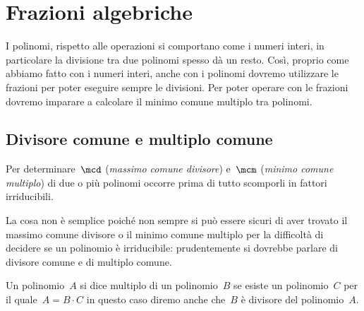 


\chapter{Frazioni algebriche}

% 

I polinomi, rispetto alle operazioni si comportano come i numeri interi, 
in particolare la divisione tra due polinomi spesso dà un resto. 
Così, proprio come abbiamo fatto con i numeri interi, anche con i polinomi 
dovremo utilizzare le frazioni per poter eseguire sempre le divisioni. 
Per poter operare con le frazioni dovremo imparare a calcolare il minimo 
comune multiplo tra polinomi.

\section{Divisore comune e multiplo comune}
\label{sec:frazalg_MCDemcm}

Per determinare~\(\mcd\) (\emph{massimo comune divisore}) 
e~\(\mcm\) (\emph{minimo comune multiplo}) di due o più polinomi occorre 
prima di tutto scomporli in fattori 
irriducibili.

\begin{osservazione}{}{} 
La cosa non è semplice poiché non sempre si può essere sicuri di aver 
trovato il massimo comune divisore o il minimo comune multiplo
per la difficoltà di decidere se un polinomio è irriducibile: 
prudentemente si dovrebbe parlare di divisore comune e di multiplo comune.
\end{osservazione}

Un polinomio~\(A\) si dice multiplo di un 
polinomio~\(B\) se 
esiste un polinomio~\(C\) per il quale~\(A=B\cdot C\) in questo caso diremo
anche che~\(B\) è divisore del polinomio~\(A\).


